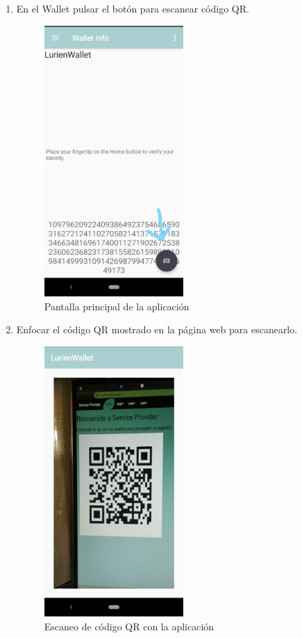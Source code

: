 \documentclass[12pt]{report}
\begin{document}
\begin{enumerate}
\item En el Wallet pulsar el botón para escanear código QR.
\begin{figure}[H]
\includegraphics[width=0.5\textwidth]{main-screen}
\caption{Pantalla principal de la aplicación}
\end{figure}

\item Enfocar el código QR mostrado en la página web para escanearlo.
\begin{figure}[H]
\includegraphics[width=0.5\textwidth]{qr-scan}
\caption{Escaneo de código QR con la aplicación}
\end{figure}


\end{enumerate}
\end{document}
